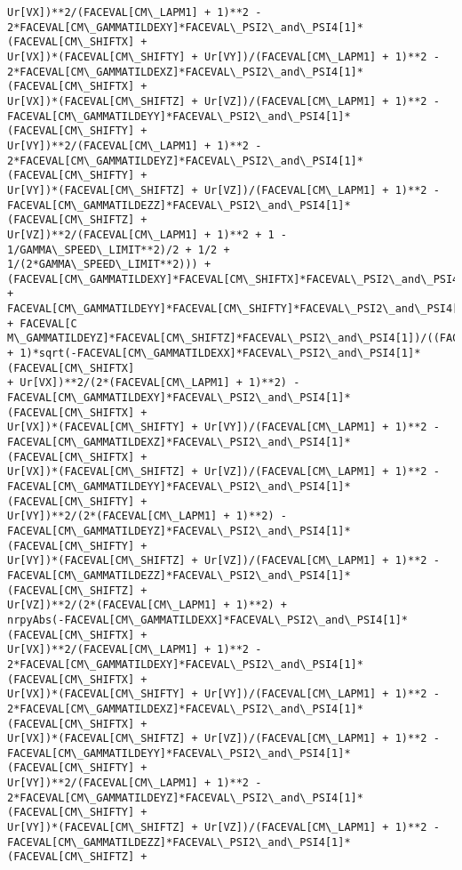 \documentclass[landscape,letterpaper,10pt,english]{article}
\begin{document}
\begin{Verbatim}[commandchars=\\\{\}]
Ur[VX])**2/(FACEVAL[CM\_LAPM1] + 1)**2 -
2*FACEVAL[CM\_GAMMATILDEXY]*FACEVAL\_PSI2\_and\_PSI4[1]*(FACEVAL[CM\_SHIFTX] +
Ur[VX])*(FACEVAL[CM\_SHIFTY] + Ur[VY])/(FACEVAL[CM\_LAPM1] + 1)**2 -
2*FACEVAL[CM\_GAMMATILDEXZ]*FACEVAL\_PSI2\_and\_PSI4[1]*(FACEVAL[CM\_SHIFTX] +
Ur[VX])*(FACEVAL[CM\_SHIFTZ] + Ur[VZ])/(FACEVAL[CM\_LAPM1] + 1)**2 -
FACEVAL[CM\_GAMMATILDEYY]*FACEVAL\_PSI2\_and\_PSI4[1]*(FACEVAL[CM\_SHIFTY] +
Ur[VY])**2/(FACEVAL[CM\_LAPM1] + 1)**2 -
2*FACEVAL[CM\_GAMMATILDEYZ]*FACEVAL\_PSI2\_and\_PSI4[1]*(FACEVAL[CM\_SHIFTY] +
Ur[VY])*(FACEVAL[CM\_SHIFTZ] + Ur[VZ])/(FACEVAL[CM\_LAPM1] + 1)**2 -
FACEVAL[CM\_GAMMATILDEZZ]*FACEVAL\_PSI2\_and\_PSI4[1]*(FACEVAL[CM\_SHIFTZ] +
Ur[VZ])**2/(FACEVAL[CM\_LAPM1] + 1)**2 + 1 - 1/GAMMA\_SPEED\_LIMIT**2)/2 + 1/2 +
1/(2*GAMMA\_SPEED\_LIMIT**2))) +
(FACEVAL[CM\_GAMMATILDEXY]*FACEVAL[CM\_SHIFTX]*FACEVAL\_PSI2\_and\_PSI4[1] +
FACEVAL[CM\_GAMMATILDEYY]*FACEVAL[CM\_SHIFTY]*FACEVAL\_PSI2\_and\_PSI4[1] + FACEVAL[C
M\_GAMMATILDEYZ]*FACEVAL[CM\_SHIFTZ]*FACEVAL\_PSI2\_and\_PSI4[1])/((FACEVAL[CM\_LAPM1]
+ 1)*sqrt(-FACEVAL[CM\_GAMMATILDEXX]*FACEVAL\_PSI2\_and\_PSI4[1]*(FACEVAL[CM\_SHIFTX]
+ Ur[VX])**2/(2*(FACEVAL[CM\_LAPM1] + 1)**2) -
FACEVAL[CM\_GAMMATILDEXY]*FACEVAL\_PSI2\_and\_PSI4[1]*(FACEVAL[CM\_SHIFTX] +
Ur[VX])*(FACEVAL[CM\_SHIFTY] + Ur[VY])/(FACEVAL[CM\_LAPM1] + 1)**2 -
FACEVAL[CM\_GAMMATILDEXZ]*FACEVAL\_PSI2\_and\_PSI4[1]*(FACEVAL[CM\_SHIFTX] +
Ur[VX])*(FACEVAL[CM\_SHIFTZ] + Ur[VZ])/(FACEVAL[CM\_LAPM1] + 1)**2 -
FACEVAL[CM\_GAMMATILDEYY]*FACEVAL\_PSI2\_and\_PSI4[1]*(FACEVAL[CM\_SHIFTY] +
Ur[VY])**2/(2*(FACEVAL[CM\_LAPM1] + 1)**2) -
FACEVAL[CM\_GAMMATILDEYZ]*FACEVAL\_PSI2\_and\_PSI4[1]*(FACEVAL[CM\_SHIFTY] +
Ur[VY])*(FACEVAL[CM\_SHIFTZ] + Ur[VZ])/(FACEVAL[CM\_LAPM1] + 1)**2 -
FACEVAL[CM\_GAMMATILDEZZ]*FACEVAL\_PSI2\_and\_PSI4[1]*(FACEVAL[CM\_SHIFTZ] +
Ur[VZ])**2/(2*(FACEVAL[CM\_LAPM1] + 1)**2) +
nrpyAbs(-FACEVAL[CM\_GAMMATILDEXX]*FACEVAL\_PSI2\_and\_PSI4[1]*(FACEVAL[CM\_SHIFTX] +
Ur[VX])**2/(FACEVAL[CM\_LAPM1] + 1)**2 -
2*FACEVAL[CM\_GAMMATILDEXY]*FACEVAL\_PSI2\_and\_PSI4[1]*(FACEVAL[CM\_SHIFTX] +
Ur[VX])*(FACEVAL[CM\_SHIFTY] + Ur[VY])/(FACEVAL[CM\_LAPM1] + 1)**2 -
2*FACEVAL[CM\_GAMMATILDEXZ]*FACEVAL\_PSI2\_and\_PSI4[1]*(FACEVAL[CM\_SHIFTX] +
Ur[VX])*(FACEVAL[CM\_SHIFTZ] + Ur[VZ])/(FACEVAL[CM\_LAPM1] + 1)**2 -
FACEVAL[CM\_GAMMATILDEYY]*FACEVAL\_PSI2\_and\_PSI4[1]*(FACEVAL[CM\_SHIFTY] +
Ur[VY])**2/(FACEVAL[CM\_LAPM1] + 1)**2 -
2*FACEVAL[CM\_GAMMATILDEYZ]*FACEVAL\_PSI2\_and\_PSI4[1]*(FACEVAL[CM\_SHIFTY] +
Ur[VY])*(FACEVAL[CM\_SHIFTZ] + Ur[VZ])/(FACEVAL[CM\_LAPM1] + 1)**2 -
FACEVAL[CM\_GAMMATILDEZZ]*FACEVAL\_PSI2\_and\_PSI4[1]*(FACEVAL[CM\_SHIFTZ] +

\end{Verbatim}
\end{document}
